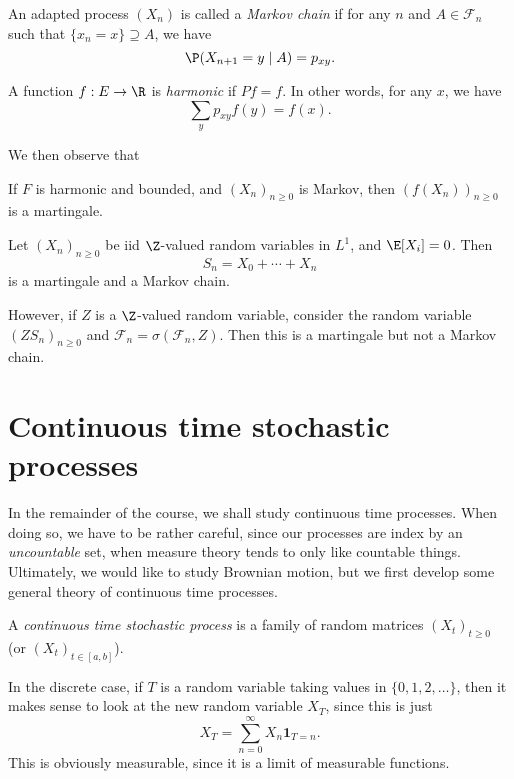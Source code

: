 \documentclass[a4paper]{article}
\begin{document}
\begin{defi}
  An adapted process $(X_n)$ is called a \emph{Markov chain} if for any $n$ and $A \in \mathcal{F}_n$ such that $\{x_n = x\} \supseteq A$, we have
  \[
    \P(X_{n + 1} = y\mid A) = p_{xy}.
  \]
\end{defi}

\begin{defi}
  A function $f: E \to \R$ is \emph{harmonic} if $Pf = f$. In other words, for any $x$, we have
  \[
    \sum_{y} p_{xy} f(y) = f(x).
  \]
\end{defi}
We then observe that

\begin{prop}
  If $F$ is harmonic and bounded, and $(X_n)_{n \geq 0}$ is Markov, then $(f(X_n))_{n \geq 0}$ is a martingale.
\end{prop}

\begin{eg}
  Let $(X_n)_{n \geq 0}$ be iid $\Z$-valued random variables in $L^1$, and $\E[X_i] = 0$. Then
  \[
    S_n = X_0 + \cdots + X_n
  \]
  is a martingale and a Markov chain.

  However, if $Z$ is a $\Z$-valued random variable, consider the random variable $(ZS_n)_{n \geq 0}$ and $\mathcal{F}_n = \sigma(\mathcal{F}_n, Z)$. Then this is a martingale but not a Markov chain.
\end{eg}

\section{Continuous time stochastic processes}
In the remainder of the course, we shall study continuous time processes. When doing so, we have to be rather careful, since our processes are index by an \emph{uncountable} set, when measure theory tends to only like countable things. Ultimately, we would like to study Brownian motion, but we first develop some general theory of continuous time processes.

\begin{defi}
  A \emph{continuous time stochastic process} is a family of random matrices $(X_t)_{t \geq 0}$ (or $(X_t)_{t \in [a, b]}$).
\end{defi}

In the discrete case, if $T$ is a random variable taking values in $\{0, 1, 2, \ldots\}$, then it makes sense to look at the new random variable $X_T$, since this is just
\[
  X_T = \sum_{n = 0}^\infty X_n \mathbf{1}_{T = n}.
\]
This is obviously measurable, since it is a limit of measurable functions.
\end{document}
